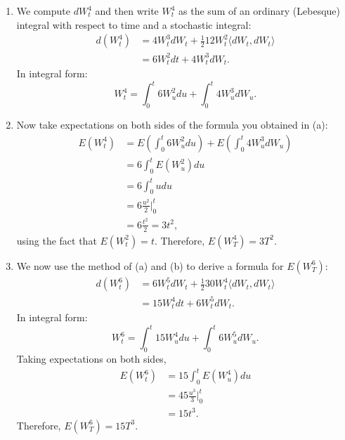 \documentclass[handout,8pt]{beamer}
\begin{document}
\begin{frame}[allowframebreaks]{ }
\begin{enumerate}
    \begin{enumerate}
        \item We compute $dW_t^4$ and then write $W_t^4$ as the sum of an ordinary (Lebesque) integral with respect to time and a stochastic integral:
        \begin{align*}
            d(W_t^4) &= 4W_t^3 dW_t + \frac{1}{2}12W_t^2 \langle dW_t,dW_t \rangle\\
            &= 6W_t^2 dt + 4W_t^3 dW_t.
        \end{align*}
        In integral form:
        \begin{equation*}
            W_t^4 = \int_0^t 6W_u^2 du + \int_0^t 4W_u^3 dW_u.
        \end{equation*}
        
        \item Now take expectations on both sides of the formula you obtained in (a):
        \begin{align*}
            E(W_t^4) &= E\left(\int_0^t 6W_u^2 du\right) + E\left(\int_0^t 4W_u^3 dW_u\right)\\
            &= 6\int_0^t E(W_u^2) du\\
            &= 6 \int_0^t u du\\
            &= 6 \frac{u^2}{2}\bigg\vert_0^t\\
            &= 6\frac{t^2}{2}=3t^2,
        \end{align*}
        using the fact that $E(W_t^2)=t$. Therefore, $E(W_T^4)=3T^2$.
        
        \item We now use the method of (a) and (b) to derive a formula for $E(W_T^6)$:
        \begin{align*}
            d(W_t^6) &= 6W_t^5 dW_t + \frac{1}{2}30W_t^4 \langle dW_t,dW_t \rangle\\
            &= 15W_t^4 dt + 6W_t^5 dW_t.
        \end{align*}
        In integral form:
        \begin{equation*}
            W_t^6=\int_0^t 15W_u^4 du + \int_0^t 6W_u^5 dW_u.
        \end{equation*}
        Taking expectations on both sides,
        \begin{align*}
            E(W_t^6) &= 15\int_0^t E(W_u^4) du\\
            &= 45 \frac{u^3}{3}\bigg\vert^t_0\\
            &= 15t^3.
        \end{align*}
        Therefore, $E(W_T^6)=15T^3$.
    \end{enumerate}
    

\end{enumerate}
\end{frame}
\end{document}
